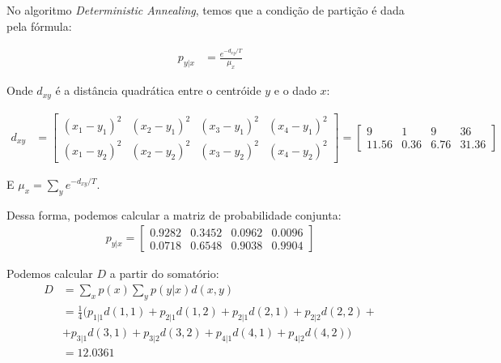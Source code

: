 \documentclass[12pt]{article}
\newenvironment{exercise}[2][Exercício]{\begin{trivlist}
\item[\hskip \labelsep {\bfseries #1}\hskip \labelsep {\bfseries #2.}]}{\end{trivlist}}
\begin{document}
\begin{exercise}{1.b}
No algoritmo \textit{Deterministic Annealing}, temos que a condição de partição
é dada pela fórmula:

\begin{align*}
p_{y|x} &= \frac{e^{-d_{xy}/T}}{\mu_x}
\end{align*}

Onde $d_{xy}$ é a distância quadrática entre o centróide $y$ e o dado $x$:

\begin{align*}
d_{xy} &= \begin{bmatrix}
(x_1-y_1)^2 & (x_2-y_1)^2 & (x_3-y_1)^2 & (x_4-y_1)^2 \\
(x_1-y_2)^2 & (x_2-y_2)^2 & (x_3-y_2)^2 & (x_4-y_2)^2
\end{bmatrix} = \begin{bmatrix} 9 & 1 & 9 & 36 \\
11.56 & 0.36 & 6.76 & 31.36 \end{bmatrix}
\end{align*}

E $\mu_x = \sum_y e^{-d_{xy}/T}$.

Dessa forma, podemos calcular a matriz de probabilidade conjunta:
\begin{align*}
p_{y|x} = \begin{bmatrix}
0.9282 & 0.3452 & 0.0962 & 0.0096\\
0.0718 & 0.6548 & 0.9038 & 0.9904
\end{bmatrix}
\end{align*}



\end{exercise}

\begin{exercise}{1.c}
Podemos calcular $D$ a partir do somatório:
\begin{align*}
D &= \sum_x p(x) \sum_y p(y|x)d(x,y) \\
&= \frac{1}{4} (p_{1|1} d(1,1) + p_{2|1}
d(1,2) + p_{2|1} d(2,1) + p_{2|2} d(2,2) + \\
&+ p_{3|1} d(3,1) + p_{3|2} d(3,2) +
p_{4|1} d(4,1) + p_{4|2} d(4,2)) \\
&= 12.0361
\end{align*}


\end{exercise}
\end{document}
